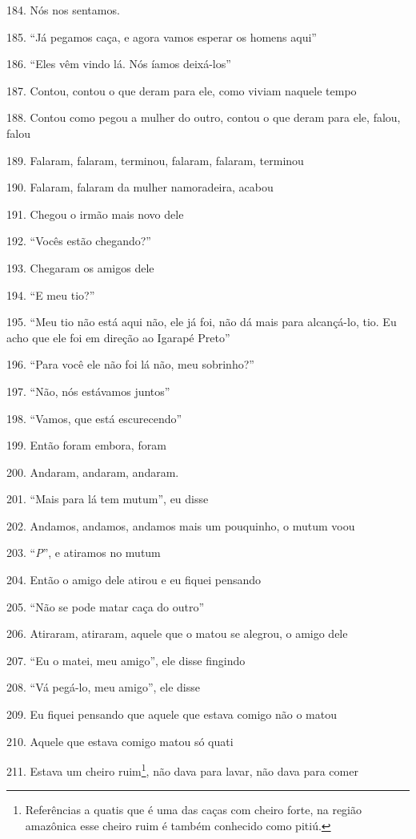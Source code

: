 184. Nós nos sentamos.

185. ``Já pegamos caça, e agora vamos esperar os homens aqui''

186. ``Eles vêm vindo lá. Nós íamos deixá-los''

187. Contou, contou o que deram para ele, como viviam naquele tempo

188. Contou como pegou a mulher do outro, contou o que deram para ele,
falou, falou

189. Falaram, falaram, terminou, falaram, falaram, terminou

190. Falaram, falaram da mulher namoradeira, acabou

191. Chegou o irmão mais novo dele

192. ``Vocês estão chegando?''

193. Chegaram os amigos dele

194. ``E meu tio?''

195. ``Meu tio não está aqui não, ele já foi, não dá mais para
alcançá-lo, tio. Eu acho que ele foi em direção ao Igarapé Preto''

196. ``Para você ele não foi lá não, meu sobrinho?''

197. ``Não, nós estávamos juntos''

198. ``Vamos, que está escurecendo''

199. Então foram embora, foram

200. Andaram, andaram, andaram.

201. ``Mais para lá tem mutum'', eu disse

202. Andamos, andamos, andamos mais um pouquinho, o mutum voou

203. ``\emph{P}'', e atiramos no mutum

204. Então o amigo dele atirou e eu fiquei pensando

205. ``Não se pode matar caça do outro''

206. Atiraram, atiraram, aquele que o matou se alegrou, o amigo dele

207. ``Eu o matei, meu amigo'', ele disse fingindo

208. ``Vá pegá-lo, meu amigo'', ele disse

209. Eu fiquei pensando que aquele que estava comigo não o matou

210. Aquele que estava comigo matou só quati

211. Estava um cheiro ruim\footnote{Referências a quatis que é uma das
  caças com cheiro forte, na região amazônica esse cheiro ruim é também
  conhecido como pitiú.}, não dava para lavar, não dava para comer

